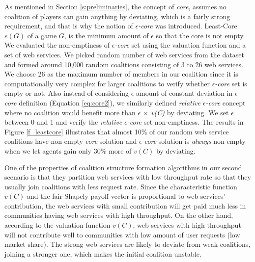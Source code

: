 As mentioned in Section \ref{s:preliminaries}, the concept of
\emph{core}, assumes no coalition of players can gain anything by
deviating, which is a fairly strong requirement, and that is why
the notion of \emph{$\epsilon$-core} was introduced. Least-Core
$e(G)$ of a game $G$, is the minimum amount of $\epsilon$ so that
the core is not empty. We evaluated the non-emptiness of \emph{$\epsilon$-core} set using the
valuation function and a set of web services. We picked random
number of web services from the dataset and formed around 10,000
random coalitions consisting of 3 to 26 web services. We choose 26
as the maximum number of members in our coalition since it
is computationally very complex for larger coalitions to verify whether
\emph{$\epsilon$-core} set is empty or not. Also instead of considering $\epsilon$ amount of constant deviation in \emph{$\epsilon$-core} definition (Equation \ref{eq:core2}), we similarly defined \emph{relative $\epsilon$-core} concept where no coalition would benefit more than \emph{$\epsilon$ $\times$ v(C)} by deviating. We set $\epsilon$ between 0 and 1 and verify the \emph{relative $\epsilon$-core} set non-emptiness. The results in Figure
\ref{f_leastcore} illustrates that almost 10\% of our random web
service coalitions have non-empty \emph{core} solution and
\emph{$\epsilon$-core} solution is \emph{always} non-empty when we
let agents gain only 30\% more of $v(C)$ by deviating.

One of the properties of coalition structure formation algorithms
in our second scenario is that they partition web services with low
throughput rate so that they usually join coalitions with less
request rate. Since the characteristic function $v(C)$ and the
fair Shapely payoff vector is proportional to web services'
contribution, the web services with small contribution will get
paid much less in communities having web services with high
throughput. On the other hand, according to the valuation function
$v(C)$, web services with high throughput will not contribute well
to communities with low amount of user requests (low market
share). The strong web services are likely to deviate from weak
coalitions, joining a stronger one, which makes the initial
coalition unstable.


